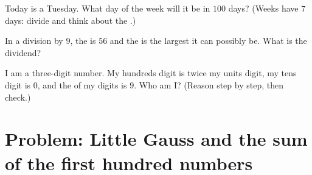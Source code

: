 \begin{exercise}[$\star\star$]\label{exo:g6:wholes:10}
Today is a Tuesday. What day of the week will it be in $100$ days?
(Weeks have $7$ days: divide and think about the .)
\end{exercise}

\begin{exercise}[$\star\star$]\label{exo:g6:wholes:11}
In a division by $9$, the  is $56$ and the  is the
largest it can possibly be. What is the dividend?
\end{exercise}

\begin{exercise}[$\star\star\star$]\label{exo:g6:wholes:12}
I am a three-digit number. My hundreds digit is twice my units digit,
my tens digit is $0$, and the  of my digits is $9$. Who am I?
(Reason step by step, then check.)
\end{exercise}

\section{Problem: Little Gauss and the sum of the first hundred
numbers}

